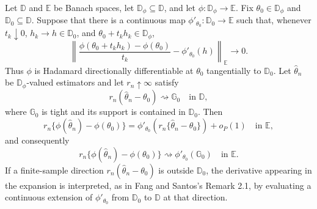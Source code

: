 Let \(\mathbb D\) and \(\mathbb E\) be Banach spaces, let \(\mathbb D_\phi\subseteq\mathbb D\), and let \(\phi:\mathbb D_\phi\to\mathbb E\).  Fix \(\theta_0\in\mathbb D_\phi\) and \(\mathbb D_0\subseteq\mathbb D\).  Suppose that there is a continuous map \(\phi'_{\theta_0}:\mathbb D_0\to\mathbb E\) such that, whenever \(t_k\downarrow0\), \(h_k\to h\in\mathbb D_0\), and \(\theta_0+t_kh_k\in\mathbb D_\phi\),
\[
\left\|\frac{\phi(\theta_0+t_kh_k)-\phi(\theta_0)}{t_k}-\phi'_{\theta_0}(h)\right\|_{\mathbb E}\longrightarrow0.
\]
Thus \(\phi\) is Hadamard directionally differentiable at \(\theta_0\) tangentially to \(\mathbb D_0\).  Let \(\widehat\theta_n\) be \(\mathbb D_\phi\)-valued estimators and let \(r_n\uparrow\infty\) satisfy
\[
r_n(\widehat\theta_n-\theta_0)\rightsquigarrow\mathbb G_0
\quad\text{in }\mathbb D,
\]
where \(\mathbb G_0\) is tight and its support is contained in \(\mathbb D_0\).  Then
\[
r_n\{\phi(\widehat\theta_n)-\phi(\theta_0)\}
=\phi'_{\theta_0}\!\left(r_n\{\widehat\theta_n-\theta_0\}\right)+o_P(1)
\quad\text{in }\mathbb E,
\]
and consequently
\[
r_n\{\phi(\widehat\theta_n)-\phi(\theta_0)\}
\rightsquigarrow\phi'_{\theta_0}(\mathbb G_0)
\quad\text{in }\mathbb E.
\]
If a finite-sample direction \(r_n(\widehat\theta_n-\theta_0)\) is outside \(\mathbb D_0\), the derivative appearing in the expansion is interpreted, as in Fang and Santos's Remark 2.1, by evaluating a continuous extension of \(\phi'_{\theta_0}\) from \(\mathbb D_0\) to \(\mathbb D\) at that direction.